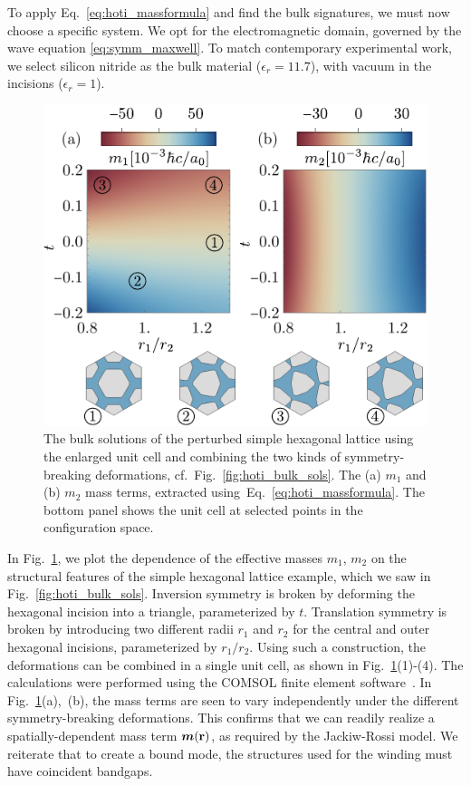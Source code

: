 To apply Eq.~\eqref{eq:hoti_massformula} and find the bulk signatures, we must now choose a specific system. We opt for the electromagnetic domain, governed by the wave equation \eqref{eq:symm_maxwell}. To match contemporary experimental work, we select silicon nitride as the bulk material ($\epsilon_r = 11.7$), with vacuum in the incisions ($\epsilon_r = 1$).
%
\begin{figure} [h!]
	\centering
	\hspace*{-5mm}
	\includegraphics[scale=0.9]{figures/hoti/fig3.pdf}
	\caption{The bulk solutions of the perturbed simple hexagonal lattice using the enlarged unit cell and combining the two kinds of symmetry-breaking deformations, cf.~Fig.~\ref{fig:hoti_bulk_sols}. The (a) $m_1$ and (b) $m_2$ mass terms, extracted using~Eq.~\eqref{eq:hoti_massformula}. The bottom panel shows the unit cell at selected points in the configuration space.}
	\label{fig:hoti_bulk_sig}
\end{figure} 
%
In Fig.~\ref{fig:hoti_bulk_sig}, we plot the dependence of the effective masses $m_1$, $m_2$ on the structural features of the simple hexagonal lattice example, which we saw in Fig.~\ref{fig:hoti_bulk_sols}. Inversion symmetry is broken by deforming the hexagonal incision into a triangle, parameterized by $t$. Translation symmetry is broken by introducing two different radii $r_1$ and $r_2$ for the central and outer hexagonal incisions, parameterized by $r_1/r_2$. Using such a construction, the deformations can be combined in a single unit cell, as shown in Fig.~\ref{fig:hoti_bulk_sig}(1)-(4). The calculations were performed using the COMSOL finite element software~\cite{comsol}. In Fig.~\ref{fig:hoti_bulk_sig}(a),~(b), the mass terms are seen to vary independently under the different symmetry-breaking deformations. This confirms that we can readily realize a spatially-dependent mass term $\boldsymbol{m}(\vb{r})$, as required by the Jackiw-Rossi model. We reiterate that to create a bound mode, the structures used for the winding must have coincident bandgaps.

